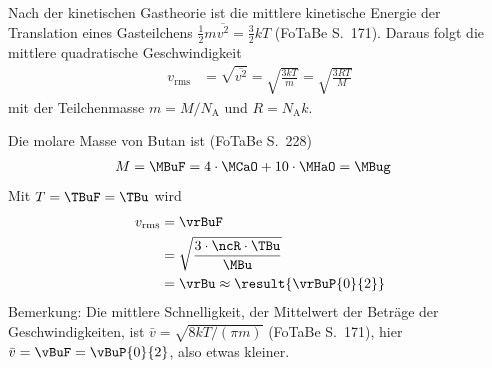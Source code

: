 Nach der kinetischen Gastheorie ist die mittlere kinetische Energie der Translation eines Gasteilchens $\frac{1}{2}m\overline{v^2} = \frac{3}{2}kT$ (FoTaBe S.~171). Daraus folgt die mittlere quadratische Geschwindigkeit
\begin{align}
 v_\text{rms} &= \sqrt{\overline{v^2}} = \sqrt{\frac{3kT}{m}} = \sqrt{\frac{3RT}{M}}
\end{align}
mit der Teilchenmasse $m = M/N_\text{A}$ und $R = N_\text{A}k$.

Die molare Masse von Butan ist (FoTaBe S.~228)
\begin{align}
 M &= \MBuF = 4\cdot\MCaO + 10\cdot\MHaO = \MBug
\end{align}
Mit $T = \TBuF = \TBu$ wird
\begin{align}
 v_\text{rms} &= \vrBuF \\
   &= \sqrt{\frac{3\cdot\ncR\cdot\TBu}{\MBu}} \\
   &= \vrBu \approx \result{\vrBuP{0}{2}}
\end{align}
Bemerkung: Die mittlere Schnelligkeit, der Mittelwert der Beträge der Geschwindigkeiten, ist $\bar v = \sqrt{8kT/(\pi m)}$ (FoTaBe S.~171), hier $\bar v = \vBuF = \vBuP{0}{2}$, also etwas kleiner.
